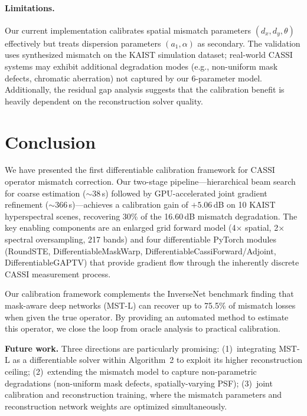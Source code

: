 \documentclass[runningheads]{llncs}
\begin{document}
\paragraph{Limitations.}
Our current implementation calibrates spatial mismatch parameters $(d_x, d_y, \theta)$ effectively but treats dispersion parameters $(a_1, \alpha)$ as secondary.
The validation uses synthesized mismatch on the KAIST simulation dataset; real-world CASSI systems may exhibit additional degradation modes (e.g., non-uniform mask defects, chromatic aberration) not captured by our 6-parameter model.
Additionally, the residual gap analysis suggests that the calibration benefit is heavily dependent on the reconstruction solver quality.

\section{Conclusion}
\label{sec:conclusion}

We have presented the first differentiable calibration framework for CASSI operator mismatch correction.
Our two-stage pipeline---hierarchical beam search for coarse estimation ($\sim$38\,s) followed by GPU-accelerated joint gradient refinement ($\sim$366\,s)---achieves a calibration gain of $+5.06$\,dB on 10 KAIST hyperspectral scenes, recovering 30\% of the 16.60\,dB mismatch degradation.
The key enabling components are an enlarged grid forward model (4$\times$ spatial, 2$\times$ spectral oversampling, 217 bands) and four differentiable PyTorch modules (RoundSTE, DifferentiableMaskWarp, DifferentiableCassiForward/Adjoint, DifferentiableGAPTV) that provide gradient flow through the inherently discrete CASSI measurement process.

Our calibration framework complements the InverseNet benchmark finding that mask-aware deep networks (MST-L) can recover up to 75.5\% of mismatch losses when given the true operator.
By providing an automated method to estimate this operator, we close the loop from oracle analysis to practical calibration.

\textbf{Future work.}
Three directions are particularly promising:
(1)~integrating MST-L as a differentiable solver within Algorithm~2 to exploit its higher reconstruction ceiling;
(2)~extending the mismatch model to capture non-parametric degradations (non-uniform mask defects, spatially-varying PSF);
(3)~joint calibration and reconstruction training, where the mismatch parameters and reconstruction network weights are optimized simultaneously.
\end{document}
